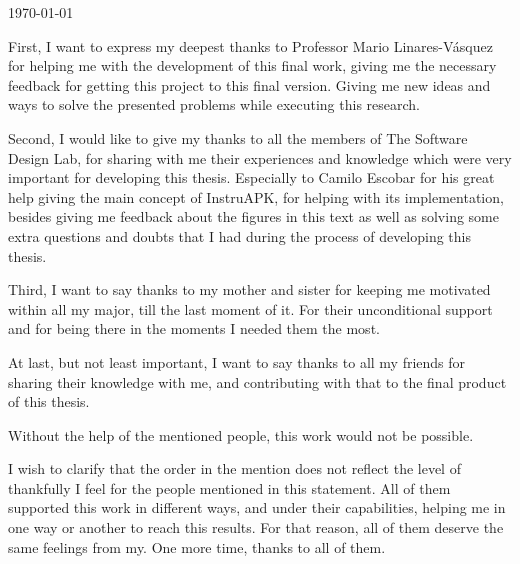 \documentclass[
12pt, %
english, %
onehalfspacing, %
nolistspacing, %
liststotoc, %
parskip, %
headsepline, %
consistentlayout, %
]{MastersDoctoralThesis} %
\begin{document}
\begin{titlepage}
\begin{center}
\vfill

{\large \today}\\
 
\vfill
\end{center}
\end{titlepage}



\begin{abstract}
\addchaptertocentry{\abstractname} %

\end{abstract}


\begin{acknowledgements}
\addchaptertocentry{\acknowledgementname} %

First, I want to express my deepest thanks to Professor Mario Linares-Vásquez for helping me with the development of this final work, giving me the necessary feedback for getting this project to this final version. Giving me new ideas and ways to solve the presented problems while executing this research.

Second, I would like to give my thanks to all the members of The Software Design Lab, for sharing with me their experiences and knowledge which were very important for developing this thesis. Especially to Camilo Escobar for his great help giving the main concept of InstruAPK, for helping with its implementation, besides giving me feedback about the figures in this text as well as solving some extra questions and doubts that I had during the process of developing this thesis.

Third, I want to say thanks to my mother and sister for keeping me motivated within all my major, till the last moment of it. For their unconditional support and for being there in the moments I needed them the most. 

At last, but not least important, I want to say thanks to all my friends for sharing their knowledge with me, and contributing with that to the final product of this thesis. 

Without the help of the mentioned people, this work would not be possible.

I wish to clarify that the order in the mention does not reflect the level of thankfully I feel for the people mentioned in this statement. All of them supported this work in different ways, and under their capabilities, helping me in one way or another to reach this results. For that reason, all of them deserve the same feelings from my. One more time, thanks to all of them.
\end{acknowledgements}
\end{document}
